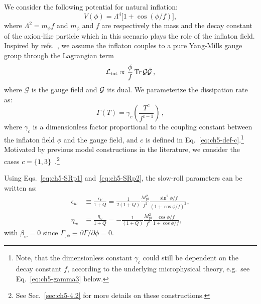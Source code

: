 We consider the following potential for natural inflation:
\begin{equation}
    V(\phi)=\Lambda^4 \Big[ 1+ \cos(\phi/f)\Big], \label{eq:ch5-3.1}
\end{equation}
where $\Lambda^2=m_\phi f$ and $m_\phi$ and $f$ are respectively the mass and the decay constant of the axion-like particle which in this scenario plays the role of the inflaton field. Inspired by refs.~\cite{Berghaus:2019whh, Berghaus:2020ekh, DeRocco:2021rzv}, we assume the inflaton couples to a pure Yang-Mills gauge group through the Lagrangian term
\begin{equation}
    \mathcal{L}_{\mathrm{int}} \propto \frac{\phi}{f} \,\mathrm{Tr}\,\mathcal{G}\Tilde{\mathcal{G}}\,,
\end{equation}
where $\mathcal G$ is the gauge field and $\Tilde{\mathcal{G}}$ its dual. We parameterize the dissipation rate as:
\begin{equation}
    \label{eq:ch5-tempdepofdissipation}
    \Gamma(T)=\gamma_c \left(\frac{T^c}{f^{c-1}}\right)\,,
\end{equation}
where $\gamma_c$ is a dimensionless factor proportional to the coupling constant between the inflaton field $\phi$ and the gauge field, and $c$ is defined in Eq.~\ref{eq:ch5-def-c}.\footnote{Note, that the dimensionless constant $\gamma_c$ could still be dependent on the decay constant $f$, according to the underlying microphysical theory, e.g.\ see Eq.~\ref{eq:ch5-gamma3} below.} Motivated by previous model constructions in the literature, we consider the cases $c=\{1,3\}$~\cite{Berghaus:2019whh, Berghaus:2020ekh}.\footnote{See Sec.~\ref{sec:ch5-4.2} for more details on these constructions.}

Using Eqs.~\ref{eq:ch5-SRp1} and~\ref{eq:ch5-SRp2}, the slow-roll parameters can be written as:
\begin{align}
    \epsilon_{w} &\equiv \frac{\epsilon_V}{1+Q}=\frac{1}{2(1+Q)} \frac{M_{\mathrm{pl}}^{2}}{f^{2}} \frac{\sin ^{2} \phi / f}{(1+\cos \phi / f)^{2}}, \label{eq:ch5-SRp11} \\
    \eta_{w} &\equiv \frac{\eta_V}{1+Q}=-\frac{1}{(1+Q)} \frac{M_{\mathrm{pl}}^{2}}{f^{2}} \frac{\cos \phi / f}{1+\cos \phi / f}, \label{eq:ch5-SRp22}
\end{align}
with $\beta_{w}=0$ since $\Gamma_{,\phi} \equiv \partial \Gamma/\partial \phi = 0$.

